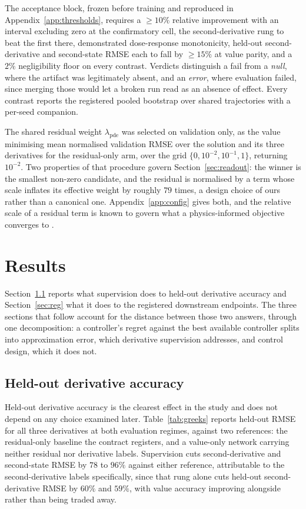 \documentclass{article}
\begin{document}
The acceptance block, frozen before training and reproduced in
Appendix~\ref{app:thresholds}, requires a $\geq 10\%$ relative improvement with an
interval excluding zero at the confirmatory cell, the second-derivative rung to beat
the first there, demonstrated dose-response monotonicity, held-out second-derivative
and second-state RMSE each to fall by $\geq 15\%$ at value parity, and a $2\%$
negligibility floor on every contrast. Verdicts distinguish a fail from a \emph{null}, where the artifact was legitimately
absent, and an \emph{error}, where evaluation failed, since merging those would let
a broken run read as an absence of effect. Every contrast reports the registered
pooled bootstrap over shared trajectories with a per-seed companion.

The shared residual weight $\lambda_{\mathrm{pde}}$ was selected on validation only,
as the value minimising mean normalised validation RMSE over the solution and its
three derivatives for the residual-only arm, over the grid
$\{0, 10^{-2}, 10^{-1}, 1\}$, returning $10^{-2}$. Two properties of that
procedure govern Section~\ref{sec:readout}: the winner is the smallest non-zero
candidate, and the residual is normalised by a term whose scale inflates its
effective weight by roughly $79$ times, a design choice of ours rather than a
canonical one. Appendix~\ref{app:config} gives both, and the relative scale of a
residual term is known to govern what a physics-informed objective converges to
\citep{wang2021understanding}.

\section{Results}
\label{sec:results}

Section~\ref{sec:delivers} reports what supervision does to held-out derivative
accuracy and Section~\ref{sec:reg} what it does to the registered downstream
endpoints. The three sections that follow account for the distance between those
two answers, through one decomposition: a controller's regret against the best
available controller splits into approximation error, which derivative
supervision addresses, and control design, which it does not.

\subsection{Held-out derivative accuracy}
\label{sec:delivers}

Held-out derivative accuracy is the clearest effect in the study and does not depend
on any choice examined later. Table~\ref{tab:greeks} reports held-out RMSE for all
three derivatives at both evaluation regimes, against two references: the
residual-only baseline the contract registers, and a value-only network carrying
neither residual nor derivative labels. Supervision cuts second-derivative and
second-state RMSE by $78$ to $96\%$ against either reference, attributable to the
second-derivative labels specifically, since that rung alone cuts held-out
second-derivative RMSE by $60\%$ and $59\%$, with value accuracy improving
alongside rather than being traded away.
\end{document}
